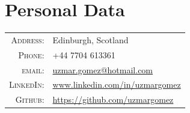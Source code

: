 \documentclass[a4paper,10pt]{article} %
\begin{document}
\bigskip
\section{Personal Data}
\bigskip
\begin{tabular}{rl}
\textsc{Address:} & Edinburgh, Scotland \\
\textsc{Phone:} & +44 7704 613361\\
\textsc{email:} & \href{mailto:uzmar.gomez@hotmail.com}{uzmar.gomez@hotmail.com}\\
\textsc{LinkedIn:} & \href{www.linkedin.com}{www.linkedin.com/in/uzmargomez}\\
\textsc{Github:} & \href{https://github.com/uzmargomez}{https://github.com/uzmargomez}%
\end{tabular}

\bigskip
\end{document}
